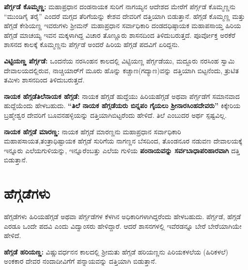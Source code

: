 \textbf{ಪೆರ್ಗ್ಗಡೆ ಕೊಮ್ಮಣ್ಣ:} ಮಹಾಪ್ರಧಾನ ದಂಡನಾಯಕ ಸುರಿಗೆ ನಾಗಯ್ಯನ ಆದೇಶದ ಮೇರೆಗೆ ಪೆರ್ಗ್ಗಡೆ ಕೊಮ್ಮಣ್ಣನು “ಮುಂಡಿಗೈ ತರೈ” ಎಂದರೆ ಮಗ್ಗದ ತೆರಿಗೆಯನ್ನು ಕೇಶವ ದೇವರಿಗೆ ದತ್ತಿಯಾಗಿ ಬಿಡುತ್ತಾನೆ. ಹೆಗ್ಗಡೆ ಕೊಮ್ಮಣ್ಣ ಮತ್ತು ಹೆಗ್ಗಡೆ ಕೇಶಿಯಣ್ಣ ಇವರುಗಳು ಶ‍್ರೀಮನ್​ ಮಹಾಪ್ರಧಾನ ಸರ್ವಾಧಿಕಾರಿ ದಂಡದಧಿಷ್ಠಾಯಕ ಮಹಾಪಸಾಯ್ತ ಹಿರಿಯ ಹೆಗ್ಗಡೆ ಮಾಚಯ್ಯ ಇವನ ಮಕ್ಕಳಾಗಿದ್ದ ವಿಚಾರ ತೊಣ್ಣೂರು ಶಾಸನದಿಂದ ತಿಳಿದುಬರುತ್ತದೆ. ಪೂರ್ವೋಕ್ತ ಅರಕೆರೆ ಶಾಸನದ ಕಾಲಕ್ಕೆ ಕೊಮ್ಮಣ್ಣನು ಪೆರ್ಗ್ಗಡೆ ಅಂದರೆ ಹಿರಿಯ ಹೆಗ್ಗಡೆ ಪದವಿಗೆ ಏರಿದ್ದನು.

\textbf{ವಿಟ್ಟಿಯಣ್ಣ ಪೆರ್ಗ್ಗಡೆ:} ಒಂದನೆಯ ನರಸಿಂಹನ ಕಾಲದಲ್ಲಿ ವಿಟ್ಟಿಯಣ್ಣ ಪೆರ್ಗ್ಗಡೆಯು, ಮದ್ದೂರು ನರಸಿಂಹ ಸ್ವಾಮಿ ದೇವಾಲಯದಲ್ಲಿರುವ, ನಾಚ್ಚಿಯಾರ್​ಗೆ ಮೂರು ಹೊನ್ನು ಕಚ್ಚಾಣ(ಗದ್ಯಾಣ)ವನ್ನು ದತ್ತಿಯಾಗಿ ಬಿಟ್ಟನೆಂದು, ತ್ರುಟಿತ ತಮಿಳು ಶಾಸನದಿಂದ ತಿಳಿದುಬರುತ್ತದೆ.

\textbf{ನಾಯಕ ಹೆಗ್ಗಡೆ\general{\enginline{-}}ತಿಲೆನಾಯಕ ಹೆಗ್ಗಡೆ:} ನಾಯಕ ಹೆಗ್ಗಡೆ ಹುದ್ದೆಯು ಹಿರಿಯಹೆಗ್ಗಡೆ ಅಥವಾ ಪೆರ್ಗ್ಗಡೆಗೆ ಸಮಾನವಾದ ಹುದ್ದೆಯೆಂದು ಹೇಳಬಹುದು. \textbf{“ತಿಲೆ ನಾಯಕ ಹೆಗ್ಗಡೆಯರು ಬಿನ್ನಪಂ ಗೈಯಲು ಶ‍್ರೀನಾರಸಿಂಹದೇವರು”} ಕಿಕ್ಕೇರಿಯ ಬ್ರಹ್ಮೇಶ್ವರ ದೇವರಿಗೆ ಬೂವನಹಳ್ಳಿಯನ್ನು ದತ್ತಿಯಾಗಿಬಿಟ್ಟರೆಂದು ಹೇಳಿದೆ. ತಿಲೆ ಎಂಬುದರ ಅರ್ಥ ಸ್ಪಷ್ಟವಿಲ್ಲ.

\textbf{ನಾಯಕ ಹೆಗ್ಗಡೆ ಮಾರಣ್ಣ:} ನಾಯಕ ಹೆಗ್ಗಡೆ ಮಾರಣ್ಣನು ಮಹಾಪ್ರಧಾನ ಸರ್ವಾಧಿಕಾರಿ ಮಹಾಪಸಾಯತ,\break ತಂತ್ರಾಧಿಷ್ಟಾಯಕ ಹೆಗ್ಗಡೆ ಸುರಿಗೆಯ ನಾಗಣ್ಣನ ಬೆಸದಿಂದ, ತೊಂಡನೂರ ನಡುವಣ ದೇವಾಲಯಕ್ಕೆ ಇನ್ನೂರು ಎಲೆಯಗುಳಿ\-ಯನ್ನು, ಇನ್ನೂರೆಂಬತ್ತು ಎಲೆಯ ಗುಳಿಯ \textbf{ಪಂನಾಯವನ್ನು ಸರ್ವಬಾಧಾಪರಿಹಾರವಾಗಿ} ದತ್ತಿ ಬಿಡುತ್ತಾನೆ.

\vskip -3pt

\section{ಹೆಗ್ಗಡೆಗಳು}

ಹೆಗ್ಗಡೆಗಳು ಹಿರಿಯಹೆಗ್ಗಡೆ ಅಥವಾ ಪೆರ್ಗ್ಗಡೆಗಳ ಕೆಳಗಿನ ಅಧಿಕಾರಿಗಳಾಗಿದ್ದರೆಂದು ಹೇಳಬಹುದು. ಪೆರ್ಗ್ಗಡೆ, ಹೆಗ್ಗಡೆ ಎರಡೂ ಒಂದೇ ಪದವಿ ಎಂದು ವಿದ್ವಾಂಸರು ಹೇಳಿದ್ದಾರೆ. ಆದರೆ ಶಾಸನಗಳಲ್ಲಿ ಇವೆರಡನ್ನೂ ಬೇರೆ ಬೇರೆಯಾಗಿಯೇ ಹೇಳಿದೆ.

\textbf{ಹೆಗ್ಗಡೆ ಹರಿಯಣ್ಣ: }ವಿಷ್ಣುವರ್ಧನನ ಕಾಲದಲ್ಲಿ ಶ‍್ರೀಮತು ಹೆಗ್ಗಡೆ ಹರಿಯಣ್ಣನು ಪಿರಿಯಕಳಲೆಯ (ಹಿರಿಕಳಲೆ) ಅಂಕಕಾರ ದೇವರ ನಂದಾದೀವಿಗೆಗೆ ಪನ್ನಾಯವನ್ನು ದತ್ತಿಯಾಗಿ ಬಿಡುತ್ತಾನೆ.

